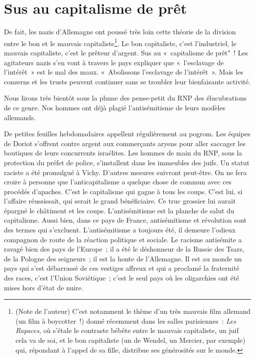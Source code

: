 \documentclass[french,twoside]{book} %
\begin{document}
\section[{Sus au capitalisme de prêt}]{Sus au capitalisme de prêt}
\noindent De fait, les nazis d’Allemagne ont poussé très loin cette théorie de la division entre le bon et le mauvais capitaliste\footnote{(Note de l’auteur) C’est notamment le thème d’un très mauvais film allemand (un film à boycotter !) donné récemment dans les salles parisiennes : \emph{Les Rapaces}, où s’étale le contraste bébête entre le mauvais capitaliste, un juif cela va de soi, et le bon capitaliste (un de Wendel, un Mercier, par exemple) qui, répondant à l’appel de sa fille, distribue ses générosités sur le monde.}. Le bon capitaliste, c’est l’industriel, le mauvais capitaliste, c’est le prêteur d’argent. Sus au « capitalisme de prêt" ! Les agitateurs nazis s’en vont à travers le pays expliquer que « l’esclavage de l’intérêt » est le mal des maux. « Abolissons l’esclavage de l’intérêt ». Mais les conzerns et les trusts peuvent continuer sans se troubler leur bienfaisante activité.\par
Nous lirons très bientôt sous la plume des pense-petit du RNP des élucubrations de ce genre. Nos hommes ont déjà plagié l’antisémitisme de leurs modèles allemands.\par
De petites feuilles hebdomadaires appellent régulièrement au pogrom. Les équipes de Doriot s’offrent contre argent aux commerçants aryens pour aller saccager les boutiques de leurs concurrents israélites. Les hommes de main du RNP, sous la protection du préfet de police, s’installent dans les immeubles des juifs. Un statut raciste a été promulgué à Vichy. D’autres mesures suivront peut-être. On ne fera croire à personne que l’anticapitalisme a quelque chose de commun avec ces procédés d’apaches. C’est le capitalisme qui gagne à tous les coups. C’est lui, si l’affaire réussissait, qui serait le grand bénéficiaire. Ce truc grossier lui aurait épargné le châtiment et les coups. L’antisémitisme est la planche de salut du capitalisme. Aussi bien, dans ce pays de France, antisémitisme et révolution sont des termes qui s’excluent. L’antisémitisme a toujours été, il demeure l’odieux compagnon de route de la réaction politique et sociale. Le racisme antisémite a ravagé bien des pays de l’Europe ; il a été le déshonneur de la Russie des Tsars, de la Pologne des seigneurs ; il est la honte de l’Allemagne. Il est au monde un pays qui s’est débarrassé de ces vestiges affreux et qui a proclamé la fraternité des races, c’est l’Union Soviétique ; c’est le seul pays où les oligarchies ont été mises hors d’état de nuire.
\end{document}
